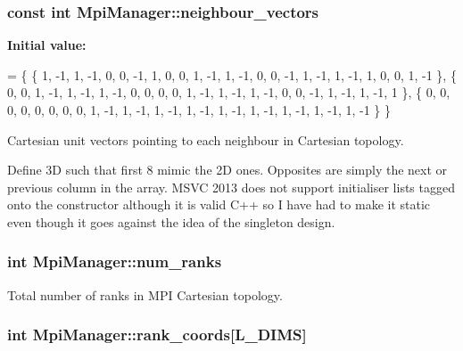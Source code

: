 \subsubsection[{\texorpdfstring{neighbour\+\_\+vectors}{neighbour_vectors}}]{\setlength{\rightskip}{0pt plus 5cm}const int Mpi\+Manager\+::neighbour\+\_\+vectors\hspace{0.3cm}{\ttfamily [static]}}\hypertarget{class_mpi_manager_a0c5f58ce12a1a8002cb124bf61e80d09}{}\label{class_mpi_manager_a0c5f58ce12a1a8002cb124bf61e80d09}
{\bfseries Initial value\+:}
\begin{DoxyCode}
= 
\{
    \{ 1, -1, 1, -1, 0, 0, -1, 1, 0, 0, 1, -1, 1, -1, 0, 0, -1, 1, -1, 1, -1, 1, 0, 0, 1, -1 \},
    \{ 0, 0, 1, -1, 1, -1, 1, -1, 0, 0, 0, 0, 1, -1, 1, -1, 1, -1, 0, 0, -1, 1, -1, 1, -1, 1 \},
    \{ 0, 0, 0, 0, 0, 0, 0, 0, 1, -1, 1, -1, 1, -1, 1, -1, 1, -1, 1, -1, 1, -1, 1, -1, 1, -1 \}
\}
\end{DoxyCode}


Cartesian unit vectors pointing to each neighbour in Cartesian topology. 

Define 3D such that first 8 mimic the 2D ones. Opposites are simply the next or previous column in the array. M\+S\+VC 2013 does not support initialiser lists tagged onto the constructor although it is valid C++ so I have had to make it static even though it goes against the idea of the singleton design. 
\subsubsection[{\texorpdfstring{num\+\_\+ranks}{num_ranks}}]{\setlength{\rightskip}{0pt plus 5cm}int Mpi\+Manager\+::num\+\_\+ranks}\hypertarget{class_mpi_manager_af5156a5e4519f43230b6b84792464e48}{}\label{class_mpi_manager_af5156a5e4519f43230b6b84792464e48}


Total number of ranks in M\+PI Cartesian topology. 

\subsubsection[{\texorpdfstring{rank\+\_\+coords}{rank_coords}}]{\setlength{\rightskip}{0pt plus 5cm}int Mpi\+Manager\+::rank\+\_\+coords\mbox{[}{\bf L\+\_\+\+D\+I\+MS}\mbox{]}}\hypertarget{class_mpi_manager_a54a3ad1d90d1508ebc82f81655d917f8}{}\label{class_mpi_manager_a54a3ad1d90d1508ebc82f81655d917f8}


